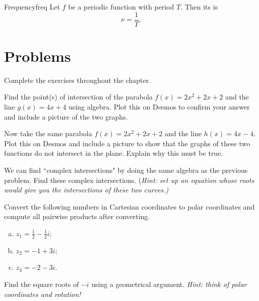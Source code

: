         \begin{df}{Frequency}{freq}
        Let $f$ be a periodic function with period $T$. Then its  is
        \[
        \nu = \frac{1}{T}.
        \]
        \end{df}

        \newpage

        \section*{Problems}
        \begin{problem}
        Complete the exercises throughout the chapter.
        \end{problem}

\begin{problem}
    Find the point(s) of intersection of the parabola $f(x)=2x^2+2x+2$ and the line $g(x)=4x+4$ using algebra. Plot this on Desmos to confirm your answer and include a picture of the two graphs.
\end{problem}

\begin{problem}
    Now take the same parabola $f(x)=2x^2+2x+2$ and the line $h(x)=4x-4$. Plot this on Desmos and include a picture to show that the graphs of these two functions do not intersect in the plane. Explain why this must be true.

    We can find ``complex intersections" by doing the same algebra as the previous problem. Find these complex intersections. (\emph{Hint: set up an equation whose roots would give you the intersections of these two curves.)}
\end{problem}

        \begin{problem}
Convert the following numbers in Cartesian coordinates to polar coordinates and compute all pairwise products after converting.
\begin{enumerate}[(a)]
    \item $z_1=\frac{1}{2}-\frac{1}{2}i$;
    \item $z_2=-1+3i$;
    \item $z_3=-2-3i$.
\end{enumerate}
\end{problem}

\begin{problem}
Find the square roots of $-i$ using a geometrical argument. \emph{Hint: think of polar coordinates and rotation!}
\end{problem}

